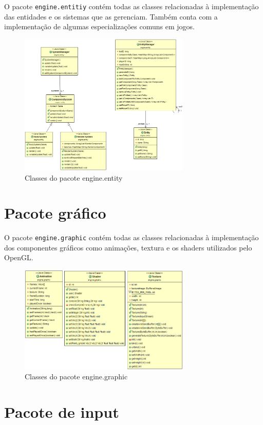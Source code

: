 \documentclass[12pt, 
openright, 
oneside, 
a4paper,    
brazil]{facom-ufu-abntex2}
\begin{document}
O pacote \texttt{engine.entitiy} contém todas as classes relacionadas à implementação das entidades e os sistemas que as gerenciam. Também conta com a implementação de algumas especializações comuns em jogos.

\begin{figure}[H]
	\centering
	\includegraphics[width=22em]{imagens/engine.entity.png}
	\caption{Classes do pacote engine.entity}
\end{figure}

\section{Pacote gráfico}

O pacote \texttt{engine.graphic} contém todas as classes relacionadas à implementação dos componentes gráficos como animações, textura e os shaders utilizados pelo OpenGL.

\begin{figure}[H]
	\centering
	\includegraphics[width=22em]{imagens/engine.graphic.png}
	\caption{Classes do pacote engine.graphic}
\end{figure}


\section{Pacote de input}
\end{document}
